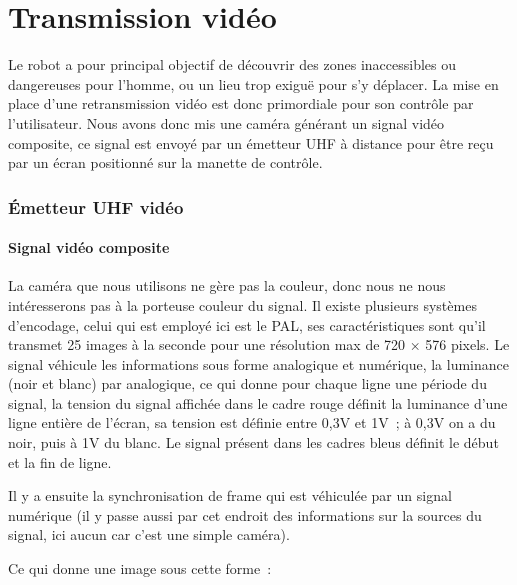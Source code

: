 
\part{Transmission vidéo}
Le robot a pour principal objectif de découvrir des zones inaccessibles ou dangereuses pour l'homme, ou un lieu trop exiguë pour s'y déplacer.  
La mise en place d'une retransmission vidéo est donc primordiale pour son contrôle par l'utilisateur.
Nous avons donc mis une caméra générant un signal vidéo composite, ce signal est envoyé par un émetteur UHF à distance pour être reçu par un écran positionné sur la manette de contrôle.
\section{Émetteur UHF vidéo}
\subsection{Signal vidéo composite}

La caméra que nous utilisons ne gère pas la couleur, donc nous ne nous intéresserons pas à la porteuse couleur du signal.
Il existe plusieurs systèmes d'encodage, celui qui est employé ici est le PAL, ses caractéristiques sont qu'il transmet 25 images à la seconde pour une résolution max de 720 × 576 pixels.
Le signal véhicule les informations sous forme analogique et numérique, la luminance (noir et blanc) par analogique, ce qui donne pour chaque ligne une période du signal, la tension du signal affichée dans le cadre rouge définit la luminance d'une ligne entière de l'écran, sa tension est définie entre 0,3V et 1V ; à 0,3V on a du noir, puis à 1V du blanc. Le signal présent dans les cadres bleus définit le début et la fin de ligne.

\begin{center}


\end{center}


Il y a ensuite la synchronisation de frame qui est véhiculée par un signal numérique (il y passe aussi par cet endroit des informations sur la sources du signal, ici aucun car c'est une simple caméra).

\begin{center}

\end{center}

Ce qui donne une image sous cette forme :

\begin{center}

\end{center}

